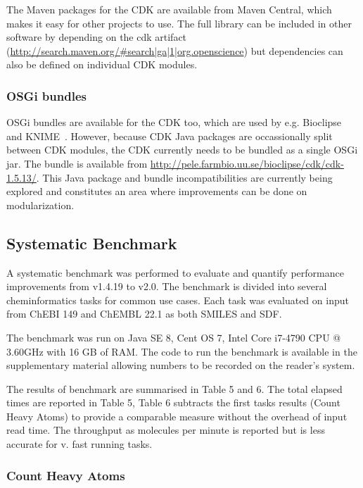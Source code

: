 \documentclass[doublespacing]{bmcart}
\def \cdkversion {v2.0}
\begin{document}
The Maven packages for the CDK are available from Maven Central, which makes it
easy for other projects to use. The full library can be included in other
software by depending on the cdk artifact (\url{http://search.maven.org/#search|ga|1|org.openscience})
but dependencies can also be defined on individual CDK modules.

\subsubsection*{OSGi bundles}

OSGi bundles are available for the CDK too, which are used by e.g.
Bioclipse~\cite{spjuth2007bioclipse,spjuth2009bioclipse} and
KNIME~\cite{Beisken2013}. However, because CDK Java packages are occassionally
split between CDK modules, the CDK currently needs to be bundled as a single
OSGi jar. The bundle is available from \url{http://pele.farmbio.uu.se/bioclipse/cdk/cdk-1.5.13/}.
This Java package and bundle incompatibilities are currently being explored and
constitutes an area where improvements can be done on modularization.

\subsection*{Systematic Benchmark}

A systematic benchmark was performed to evaluate and quantify 
performance improvements from v1.4.19 to \cdkversion{}. The benchmark is 
divided into several cheminformatics tasks for common use cases. Each task 
was evaluated on input from ChEBI 149 \cite{ChEBI13} and ChEMBL 22.1 
\cite{ChEMBL14} as both SMILES and SDF.

The benchmark was run on Java SE 8, Cent OS 7, Intel Core i7-4790 CPU @ 
3.60GHz with 16 GB of RAM. The code to run the benchmark is available in 
the supplementary material allowing numbers to be recorded on the
reader's system.

The results of benchmark are summarised in Table 5 and 6. The total elapsed
times are reported in Table 5, Table 6 subtracts the first tasks results 
(Count Heavy Atoms) to provide a comparable measure without the overhead of
input read time. The throughput as molecules per minute is reported but is less
accurate for v. fast running tasks.

\subsubsection*{Count Heavy Atoms}
\end{document}
